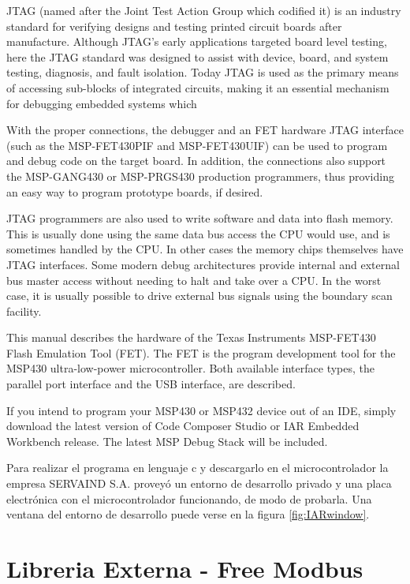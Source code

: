JTAG (named after the Joint Test Action Group which codified it) is an industry standard for verifying designs and testing printed circuit boards after manufacture.
Although JTAG's early applications targeted board level testing, here the JTAG standard was designed to assist with device, board, and system testing, diagnosis, and fault isolation. Today JTAG is used as the primary means of accessing sub-blocks of integrated circuits, making it an essential mechanism for debugging embedded systems which 

%
%
With the proper connections, the debugger and an FET hardware JTAG interface (such as the
MSP-FET430PIF and MSP-FET430UIF) can be used to program and debug code on the target board. In
addition, the connections also support the MSP-GANG430 or MSP-PRGS430 production programmers,
thus providing an easy way to program prototype boards, if desired.

JTAG programmers are also used to write software and data into flash memory. This is usually done using the same data bus access the CPU would use, and is sometimes handled by the CPU. In other cases the memory chips themselves have JTAG interfaces. Some modern debug architectures provide internal and external bus master access without needing to halt and take over a CPU. In the worst case, it is usually possible to drive external bus signals using the boundary scan facility.

This manual describes the hardware of the Texas Instruments MSP-FET430 Flash Emulation Tool (FET).
The FET is the program development tool for the MSP430 ultra-low-power microcontroller. Both available
interface types, the parallel port interface and the USB interface, are described.


If you intend to program your MSP430 or MSP432 device out of an IDE, simply download the latest version of Code Composer Studio or IAR Embedded Workbench release. The latest MSP Debug Stack will be included.

Para realizar el programa en lenguaje c y descargarlo en el microcontrolador la empresa SERVAIND S.A. proveyó un entorno de desarrollo privado y una placa electrónica con el microcontrolador funcionando, de modo de probarla. Una ventana del entorno de desarrollo puede verse en la figura \ref{fig:IARwindow}.



\section{ Libreria Externa - Free Modbus}
\label{sec:cap2parte3}




